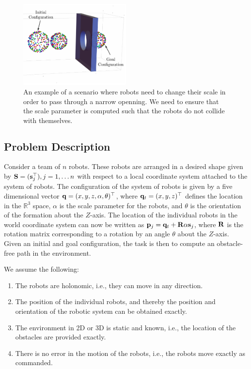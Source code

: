 \documentclass[12pt,a4paper, onecolumn]{IEEEtran}
\newcommand{\vsj}{\mv s_j}
\begin{document}
\begin{figure}[htbp]
  \centering
  \includegraphics[width=0.5\textwidth]{r200_all}
  \caption{An example of a scenario where robots need to change their scale in order to
  pass through a narrow openning. We need to ensure that the scale parameter is computed
  such that the robots do not collide with
themselves.}
  \label{fig:r200}
\end{figure}

\subsection{Problem Description}
Consider a team of $n$ robots. These robots are arranged in a desired shape given by $\mv S =(\vsj^\top), j = 1, \ldots n$ with respect to a local coordinate system attached to the system of robots. The configuration of the system of robots is given by a five dimensional vector $\mathbf{q} = (x, y, z, \alpha, \theta)^\top$, where $\mathbf{q}_t = (x, y, z)^\top$ defines the location in the $\mathbb R^3$ space, $\alpha$ is the scale parameter for the robots, and $\theta$ is the orientation of the formation about the $Z$-axis. The location of the individual robots in the world coordinate system can now be written as $\mv p_j = \mv q_t + \mv R \alpha \vsj$, where $\mathbf{R}$ is the rotation matrix corresponding to a rotation by an angle $\theta$ about the $Z$-axis. Given an initial and goal configuration, the task is then to compute an obstacle-free path in the environment.

We assume the following:
\begin{enumerate}
  \item The robots are holonomic, i.e., they can move in any direction.
  \item The position of the individual robots, and thereby the position and orientation of the robotic system can be obtained exactly.
  \item The environment in 2D or 3D is static and known, i.e., the location of the obstacles are provided exactly.
  \item There is no error in the motion of the robots, i.e., the robots move exactly as commanded.
\end{enumerate}
\end{document}
